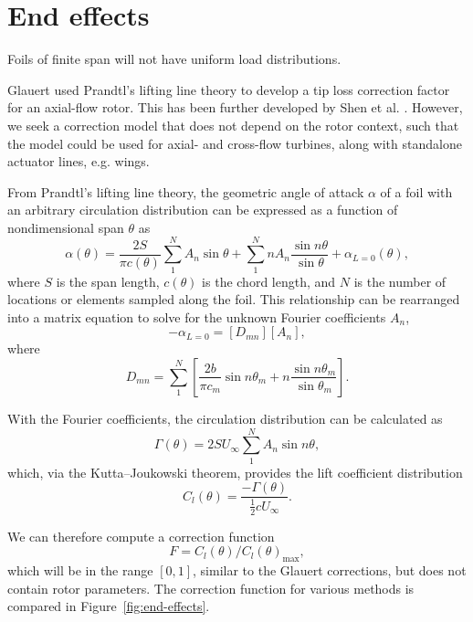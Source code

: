 \section{End effects}

Foils of finite span will not have uniform load distributions.

Glauert used Prandtl's lifting line theory to develop a tip loss correction
factor for an axial-flow rotor. This has been further developed by Shen et al.
\cite{Shen2005a}. However, we seek a correction model that does not depend on
the rotor context, such that the model could be used for axial- and cross-flow
turbines, along with standalone actuator lines, e.g. wings.

From Prandtl's lifting line theory, the geometric angle of attack $\alpha$ of a
foil with an arbitrary circulation distribution can be expressed as a function
of nondimensional span $\theta$ as \cite{Anderson2001}
\begin{equation}
    \alpha (\theta) = \frac{2S}{\pi c (\theta)}
    \sum_1^N A_n \sin \theta
    + \sum_1^N n A_n \frac{\sin n \theta}{\sin \theta}
    + \alpha_{L = 0}(\theta),
    \label{eq:lifting-line}
\end{equation}
where $S$ is the span length, $c(\theta)$ is the chord length, and $N$ is the
number of locations or elements sampled along the foil. This relationship can be
rearranged into a matrix equation to solve for the unknown Fourier coefficients
$A_n$,
\begin{equation}
    [\alpha_m ] - \alpha_{L=0} = [D_{mn}][A_n],
\end{equation}
where
\begin{equation}
    D_{mn} = \sum_1^N \left[ \frac{2b}{\pi c_m} \sin n \theta_m + n \frac{\sin n
        \theta_m}{\sin \theta_m} \right].
\end{equation}

With the Fourier coefficients, the circulation distribution can be calculated as
\begin{equation}
    \Gamma (\theta) = 2SU_\infty \sum_1^N A_n \sin n \theta,
\end{equation}
which, via the Kutta--Joukowski theorem, provides the lift coefficient
distribution
\begin{equation}
    C_l(\theta) = \frac{-\Gamma (\theta)}{\frac{1}{2} c U_\infty}.
\end{equation}

We can therefore compute a correction function 
\begin{equation}
    F = C_l(\theta)/C_l(\theta)_{\max},
\end{equation}
which will be in the range $[0, 1]$, similar to the Glauert corrections, but
does not contain rotor parameters. The correction function for various methods
is compared in Figure~\ref{fig:end-effects}.

